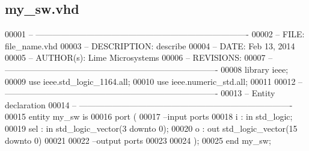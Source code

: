 \subsection{my\+\_\+sw.\+vhd}
\label{my__sw_8vhd_source}

\begin{DoxyCode}
00001 \textcolor{keyword}{-- ---------------------------------------------------------------------------- }
00002 \textcolor{keyword}{-- FILE:    file\_name.vhd}
00003 \textcolor{keyword}{-- DESCRIPTION: describe}
00004 \textcolor{keyword}{-- DATE:    Feb 13, 2014}
00005 \textcolor{keyword}{-- AUTHOR(s):   Lime Microsystems}
00006 \textcolor{keyword}{-- REVISIONS:}
00007 \textcolor{keyword}{-- ---------------------------------------------------------------------------- }
00008 \textcolor{vhdlkeyword}{library }\textcolor{keywordflow}{ieee};
00009 \textcolor{vhdlkeyword}{use }ieee.std\_logic\_1164.\textcolor{keywordflow}{all};
00010 \textcolor{vhdlkeyword}{use }ieee.numeric\_std.\textcolor{keywordflow}{all};
00011 
00012 \textcolor{keyword}{-- ----------------------------------------------------------------------------}
00013 \textcolor{keyword}{-- Entity declaration}
00014 \textcolor{keyword}{-- ----------------------------------------------------------------------------}
00015 \textcolor{keywordflow}{entity }my_sw \textcolor{keywordflow}{is}
00016   \textcolor{keywordflow}{port} \textcolor{vhdlchar}{(}
00017 \textcolor{keyword}{        --input ports }
00018         \textcolor{vhdlchar}{i}       \textcolor{vhdlchar}{:} \textcolor{keywordflow}{in} \textcolor{comment}{std\_logic};
00019         \textcolor{vhdlchar}{sel}      \textcolor{vhdlchar}{:} \textcolor{keywordflow}{in} \textcolor{comment}{std\_logic\_vector}\textcolor{vhdlchar}{(}\textcolor{vhdllogic}{}\textcolor{vhdllogic}{3} \textcolor{keywordflow}{downto} \textcolor{vhdllogic}{}\textcolor{vhdllogic}{0}\textcolor{vhdlchar}{)};
00020           \textcolor{vhdlchar}{o}          \textcolor{vhdlchar}{:} \textcolor{keywordflow}{out} \textcolor{comment}{std\_logic\_vector}\textcolor{vhdlchar}{(}\textcolor{vhdllogic}{}\textcolor{vhdllogic}{15} \textcolor{keywordflow}{downto} \textcolor{vhdllogic}{}\textcolor{vhdllogic}{0}\textcolor{vhdlchar}{)}
00021 
00022 \textcolor{keyword}{        --output ports }
00023         
00024         \textcolor{vhdlchar}{)};
00025 \textcolor{keywordflow}{end} \textcolor{vhdlchar}{my\_sw};

\end{DoxyCode}
